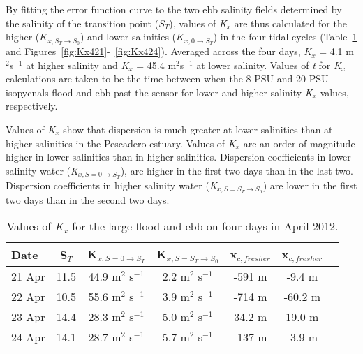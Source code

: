 By fitting the error function curve to the two ebb salinity fields determined by the salinity of the transition point ($S_T$), values of \emph{K$_x$} are thus calculated for the higher ($K_{x,S_T\rightarrow S_0}$) and lower salinities ($K_{x,0\rightarrow S_T}$) in the four tidal cycles (Table~\ref{tab:Kxtable} and Figures~\ref{fig:Kx421}-~\ref{fig:Kx424}). Averaged across the four days, \emph{K$_x$} = 4.1 m$^2$s$^{-1}$ at higher salinity and \emph{K$_x$} = 45.4 m$^2$s$^{-1}$ at lower salinity. Values of \emph{t} for \emph{K$_x$} calculations are taken to be the time between when the 8 PSU and 20 PSU isopycnals flood and ebb past the sensor for lower and higher salinity \emph{K$_x$} values, respectively. 

Values of \emph{K$_x$} show that dispersion is much greater at lower salinities than at higher salinities in the Pescadero estuary.  Values of \emph{K$_x$} are an order of magnitude higher in lower salinities than in higher salinities. Dispersion coefficients in lower salinity water (\emph{K$_{x,S=0 \rightarrow S_T}$}), are higher in the first two days than in the last two. Dispersion coefficients in higher salinity water (\emph{K$_{x,S=S_T \rightarrow S_0}$}) are lower in the first two days than in the second two days. 

\begin{table}[h]
\renewcommand{\arraystretch}{1.3}

	\begin{center}
		\begin{tabular}{| l || c | c | c | c | c | c |}
		\hline
		Date & S$_{T}$ & K$_{x,S=0 \rightarrow S_T}$ &  K$_{x,S=S_T \rightarrow S_0}$ & x$_{c,fresher}$ & x$_{c,fresher}$\\
		\hline \hline
		21 Apr & 11.5 & 44.9 m$^2$ s$^{-1}$ & 2.2 m$^2$ s$^{-1}$ & -591 m & -9.4 m\\ 
		22 Apr & 10.5 & 55.6 m$^2$ s$^{-1}$ & 3.9 m$^2$ s$^{-1}$ & -714 m & -60.2 m\\
		23 Apr & 14.4 & 28.3 m$^2$ s$^{-1}$ & 5.0 m$^2$ s$^{-1}$ & 34.2 m & 19.0 m\\ 
		24 Apr & 14.1 & 28.7 m$^2$ s$^{-1}$ & 5.7 m$^2$ s$^{-1}$ & -137 m & -3.9 m\\  \hline 
	\end{tabular}
	\caption{Values of \emph{K$_x$} for the large flood and ebb on four days  in April 2012.}\label{tab:Kxtable}
\end{center}
\end{table}


